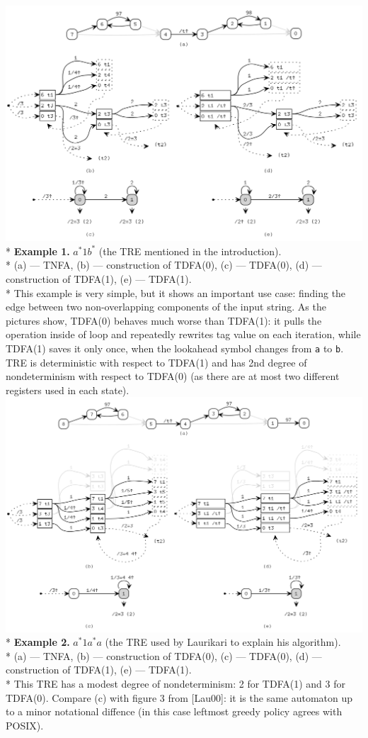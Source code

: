 \documentclass{article}
\theoremstyle{definition}
\begin{document}
\begin{center}
\includegraphics[width=0.9\linewidth]{img/example1/all.png}\\*
\textbf{Example 1.} $a^* 1 b^*$ (the TRE mentioned in the introduction).\\*\medskip
\small{
(a) --- TNFA, (b) --- construction of TDFA(0), (c) --- TDFA(0), (d) --- construction of TDFA(1), (e) --- TDFA(1).\\*\medskip
This example is very simple, but it shows an important use case:
finding the edge between two non-overlapping components of the input string.
As the pictures show, TDFA(0) behaves much worse than TDFA(1):
it pulls the operation inside of loop and repeatedly rewrites tag value on each iteration,
while TDFA(1) saves it only once, when the lookahead symbol changes from \texttt{a} to \texttt{b}.
TRE is deterministic with respect to TDFA(1)
and has 2nd degree of nondeterminism with respect to TDFA(0)
(as there are at most two different registers used in each state).
}\\[1em]

\includegraphics[width=0.9\linewidth]{img/example2/all.png}\\*
\textbf{Example 2.} $a^* 1 a^* a$ (the TRE used by Laurikari to explain his algorithm).\\*\medskip
\small{
(a) --- TNFA, (b) --- construction of TDFA(0), (c) --- TDFA(0), (d) --- construction of TDFA(1), (e) --- TDFA(1).\\*\medskip
This TRE has a modest degree of nondeterminism: 2 for TDFA(1) and 3 for TDFA(0).
Compare (c) with figure 3 from [Lau00]: it is the same automaton up to a minor notational diffence
(in this case leftmost greedy policy agrees with POSIX).
}\\[1em]


\end{center}
\end{document}
